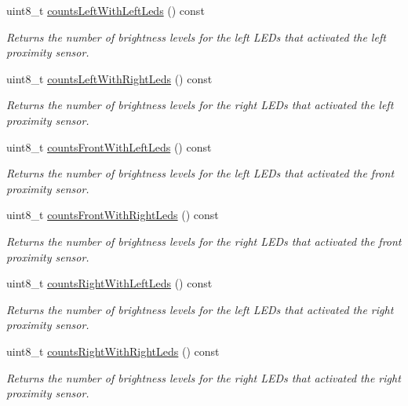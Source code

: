 \begin{DoxyCompactItemize}
uint8\+\_\+t \hyperlink{class_zumo32_u4_proximity_sensors_adb60bbaa2fffc19cfe783bf5a2ff4161}{counts\+Left\+With\+Left\+Leds} () const
\begin{DoxyCompactList}\small\item\em Returns the number of brightness levels for the left L\+E\+Ds that activated the left proximity sensor. \end{DoxyCompactList}\item 
uint8\+\_\+t \hyperlink{class_zumo32_u4_proximity_sensors_aaa0bcd5ab03cc2b7c26710cccc9114de}{counts\+Left\+With\+Right\+Leds} () const
\begin{DoxyCompactList}\small\item\em Returns the number of brightness levels for the right L\+E\+Ds that activated the left proximity sensor. \end{DoxyCompactList}\item 
uint8\+\_\+t \hyperlink{class_zumo32_u4_proximity_sensors_a9c9f5ada0b3e7b8bc14dc97bf9681090}{counts\+Front\+With\+Left\+Leds} () const
\begin{DoxyCompactList}\small\item\em Returns the number of brightness levels for the left L\+E\+Ds that activated the front proximity sensor. \end{DoxyCompactList}\item 
uint8\+\_\+t \hyperlink{class_zumo32_u4_proximity_sensors_a6eb08641584b371308b6901a0423e564}{counts\+Front\+With\+Right\+Leds} () const
\begin{DoxyCompactList}\small\item\em Returns the number of brightness levels for the right L\+E\+Ds that activated the front proximity sensor. \end{DoxyCompactList}\item 
uint8\+\_\+t \hyperlink{class_zumo32_u4_proximity_sensors_aa804ac099f3f141b60644accdb94c737}{counts\+Right\+With\+Left\+Leds} () const
\begin{DoxyCompactList}\small\item\em Returns the number of brightness levels for the left L\+E\+Ds that activated the right proximity sensor. \end{DoxyCompactList}\item 
uint8\+\_\+t \hyperlink{class_zumo32_u4_proximity_sensors_a2b2b38429cdd297068a2b0addf1c54d7}{counts\+Right\+With\+Right\+Leds} () const
\begin{DoxyCompactList}\small\item\em Returns the number of brightness levels for the right L\+E\+Ds that activated the right proximity sensor. \end{DoxyCompactList}\item 

\end{DoxyCompactItemize}
